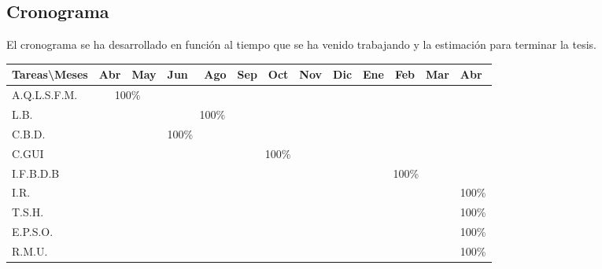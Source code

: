 \documentclass[12pt,a4paper]{report}
\begin{document}
\begin{landscape}
\section{Cronograma}
El cronograma se ha desarrollado en función al tiempo que se ha venido trabajando y la estimación para terminar la tesis.
\begin{table}[h]
\begin{tabular}{|l|l|l|l|l|l|l|l|l|l|l|l|l|}
\hline
Tareas\textbackslash{}Meses & Abr & \multicolumn{1}{c|}{May} & Jun                        & Ago & Sep & Oct & Nov & Dic & Ene     & Feb     & Mar    & Abr   \\ \hline
A.Q.L.S.F.M.                  & \multicolumn{2}{c|}{100\%}     &                            &     &     &     &     &     &         &         &        &       \\ \hline
L.B.                        &     &                          & \multicolumn{3}{c|}{100\%}             &     &     &     &         &         &        &       \\ \hline
C.B.D.                      &     &                          & \multicolumn{1}{c|}{100\%} &     &     &     &     &     &         &         &        &       \\ \hline
C.GUI                       &     &                          &                            & \multicolumn{5}{c|}{100\%}  &         &         &        &       \\ \hline
I.F.B.D.B                   &     &                          &                            &     &     &     &     &     & \multicolumn{3}{c|}{100\%} &       \\ \hline
I.R.                        &     &                          &                            &     &     &     &     &     &         &         &        & 100\% \\ \hline
T.S.H.                      &     &                          &                            &     &     &     &     &     &         &         &        & 100\% \\ \hline
E.P.S.O.                    &     &                          &                            &     &     &     &     &     &         &         &        & 100\% \\ \hline
R.M.U.                        &     &                          &                            &     &     &     &     &     &         &         &        & 100\% \\ \hline
\end{tabular}
\end{table}


\end{landscape}
\end{document}
